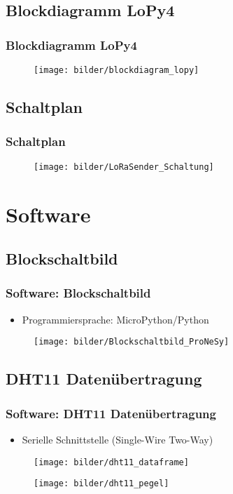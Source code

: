 \documentclass[12pt,utf8]{beamer}
\begin{document}
\subsection{Blockdiagramm LoPy4}
\begin{frame}
\frametitle{Blockdiagramm LoPy4}
\begin{figure}
 \texttt{[image: bilder/blockdiagram\_lopy]}
\end{figure}
\end{frame}

\subsection{Schaltplan}
\begin{frame}
\frametitle{Schaltplan}
\begin{figure}
 \texttt{[image: bilder/LoRaSender\_Schaltung]}
\end{figure}
\end{frame}

\section{Software}
\subsection{Blockschaltbild}
\begin{frame}
\frametitle{Software: Blockschaltbild}
\begin{itemize}
\item Programmiersprache: MicroPython/Python 
\end{itemize}
\begin{figure}
 \texttt{[image: bilder/Blockschaltbild\_ProNeSy]}
\end{figure}

\end{frame}

\subsection{DHT11 Datenübertragung}
\begin{frame}
\frametitle{Software: DHT11 Datenübertragung}
\begin{itemize}
\item Serielle Schnittstelle (Single-Wire Two-Way)
\end{itemize}
\begin{figure}
 \texttt{[image: bilder/dht11\_dataframe]}
\end{figure}
\begin{figure}
 \texttt{[image: bilder/dht11\_pegel]}
\end{figure}
\end{frame}
\end{document}
